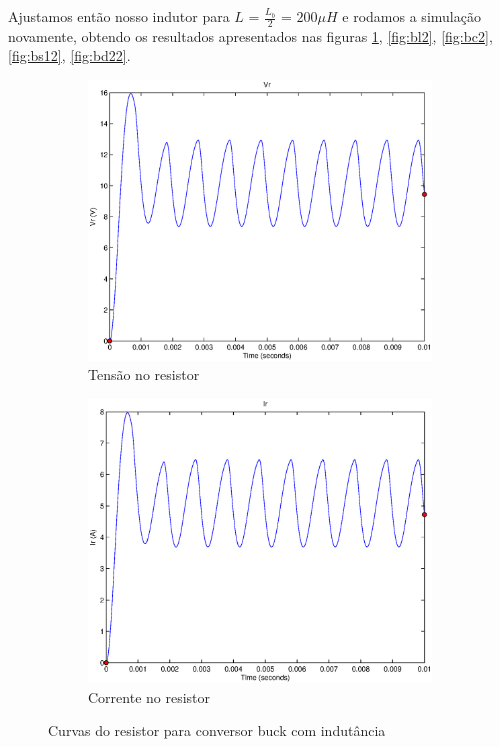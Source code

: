 \documentclass{article}
\begin{document}
Ajustamos então nosso indutor para $L$ = $\frac{L_b}{2}$ = $200 \mu H$ e rodamos a simulação novamente, obtendo os resultados apresentados nas figuras \ref{fig:br2}, \ref{fig:bl2}, \ref{fig:bc2}, \ref{fig:bs12}, \ref{fig:bd22}.

\begin{figure}[H]
	\centering
	\begin{subfigure}[b]{0.4\linewidth}
		\includegraphics[width=\linewidth]{matlab/buck/b_vr2}
		\caption{Tensão no resistor}
	\end{subfigure}
	\begin{subfigure}[b]{0.4\linewidth}
		\centering
		\includegraphics[width=\linewidth]{matlab/buck/b_ir2}
		\caption{Corrente no resistor}
	\end{subfigure}
	\caption{Curvas do resistor para conversor buck com indutância }
	\label{fig:br2}
\end{figure}
\end{document}
